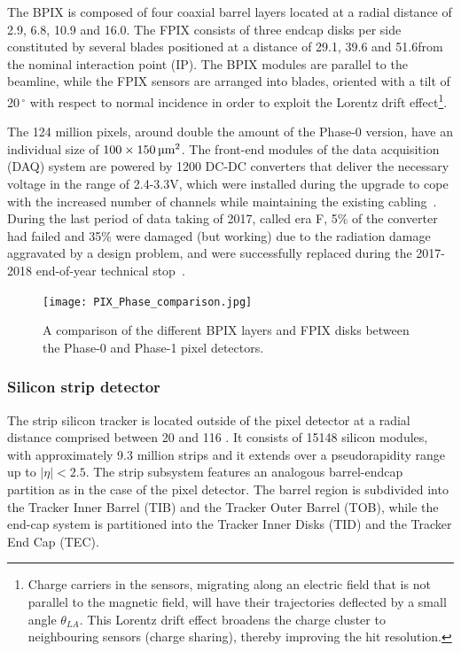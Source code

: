 The BPIX is composed of four coaxial barrel layers located at a radial distance of 2.9, 6.8, 10.9 and 16.0\cm.
The FPIX consists of three endcap disks per side constituted by several blades positioned at a distance of 29.1, 39.6 and 51.6\cm from the nominal interaction point (IP).
The BPIX modules are parallel to the beamline, while the FPIX sensors are arranged into blades, oriented with a tilt of 20$\,^{\circ}$ with respect to normal incidence in order to exploit the Lorentz drift effect\footnote{
Charge carriers in the sensors, migrating along an electric field that is not parallel to the magnetic field, will have their trajectories deflected by a small angle $\theta_{LA}$.
This Lorentz drift effect broadens the charge cluster to neighbouring sensors (charge sharing), thereby improving the hit resolution.
}.

The 124 million pixels, around double the amount of the Phase-0 version, have an individual size of $100 \times 150 \mum^2$.
The front-end modules of the data acquisition (DAQ) system are powered by 1200 DC-DC converters that deliver the necessary voltage in the range of 2.4-3.3\usep V,
which were installed during the upgrade to cope with the increased number of channels while maintaining the existing cabling~\cite{Feld_2015}.
During the last period of data taking of 2017, called era F, 5\usep \% of the converter had failed and 35\usep \% were damaged (but working) due to the radiation damage aggravated by a design problem, and were successfully replaced during the 2017-2018 end-of-year technical stop~\cite{CMS:dcdc-failure-short}.

\begin{figure}[thb]
  \centering
  \texttt{[image: PIX\_Phase\_comparison.jpg]}
  \caption{A comparison of the different BPIX layers and FPIX disks between the Phase-0 and Phase-1 pixel detectors.}
  \label{fig:PIX_Phase_comparison}
\end{figure}

\subsubsection{Silicon strip detector}
The strip silicon tracker is located outside of the pixel detector at a radial distance comprised between 20 and 116 \cm.
It consists of 15148 silicon modules, with approximately 9.3 million strips and it extends over a pseudorapidity range up to $|\eta| < 2.5$.
The strip subsystem features an analogous barrel-endcap partition as in the case of the pixel detector.
The barrel region is subdivided into the Tracker Inner Barrel (TIB) and the Tracker Outer Barrel (TOB),
while the end-cap system is partitioned into the Tracker Inner Disks (TID) and the Tracker End Cap (TEC).

